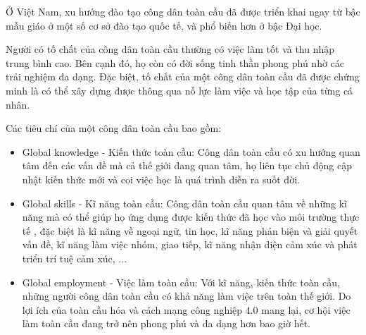 Ở Việt Nam, xu hướng đào tạo công dân toàn cầu đã được triển khai ngay từ bậc mẫu giáo ở một số cơ sở đào tạo quốc tế, và phổ biến hơn ở bậc Đại học.

Người có tố chất của công dân toàn cầu thường có việc làm tốt và thu nhập trung bình cao. Bên cạnh đó, họ còn có đời sống tinh thần phong phú nhờ các trải nghiệm đa dạng. Đặc biệt, tố chất của một công dân toàn cầu đã được chứng minh là có thể xây dựng được thông qua nỗ lực làm việc và học tập của từng cá nhân.

Các tiêu chí của một công dân toàn cầu bao gồm:
\begin{itemize}
	\item Global knowledge - Kiến thức toàn cầu: Công dân toàn cầu có xu hướng quan tâm đến các vấn đề mà cả thế giới đang quan tâm, họ liên tục chủ động cập nhật kiến thức mới và coi việc học là quá trình diễn ra suốt đời.
	\item Global skills - Kĩ năng toàn cầu: Công dân toàn cầu quan tâm về những kĩ năng mà có thể giúp họ ứng dụng được kiến thức đã học vào môi trường thực tế , đặc biệt là kĩ năng về ngoại ngữ, tin học, kĩ năng phản biện và giải quyết vấn đề, kĩ năng làm việc nhóm, giao tiếp, kĩ năng nhận diện cảm xúc và phát triển trí tuệ cảm xúc, ...
	\item Global employment - Việc làm toàn cầu: Với kĩ năng, kiến thức toàn cầu, những người công dân toàn cầu có khả năng làm việc trên toàn thế giới. Do lợi ích của toàn cầu hóa và cách mạng công nghiệp 4.0 mang lại, cơ hội việc làm toàn cầu đang trở nên phong phú và đa dạng hơn bao giờ hết.
\end{itemize}
